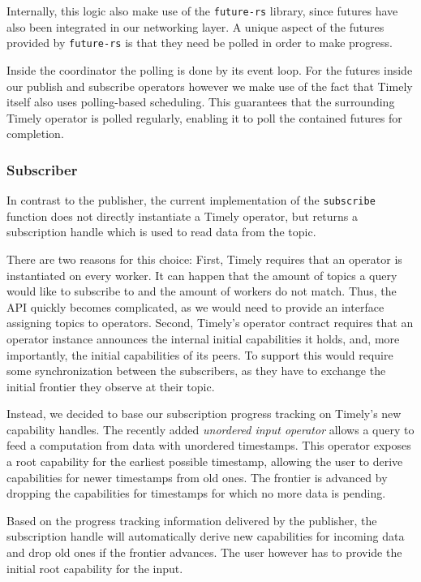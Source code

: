 Internally, this logic also make use of the \lstinline{future-rs} library, 
since futures have also been integrated in our networking layer. A unique
aspect of the futures provided by \lstinline{future-rs} is that they need
be polled in order to make progress.

Inside the coordinator the polling is done by its event loop. For the futures
inside our publish and subscribe operators however we make use of the fact
that Timely itself also uses polling-based scheduling. This guarantees that
the surrounding Timely operator is polled regularly, enabling it to poll
the contained futures for completion.

\subsubsection{Subscriber}

In contrast to the publisher, the current implementation of the \lstinline{subscribe}
function does not directly instantiate a Timely operator, but returns a subscription
handle which is used to read data from the topic.

There are two reasons for this choice: First, Timely requires that an operator
is instantiated on every worker. It can happen that the amount of topics a query
would like to subscribe to and the amount of workers do not match. Thus, the API
quickly becomes complicated, as we would need to provide an interface assigning
topics to operators.
Second, Timely's operator contract requires that an operator instance announces
the internal initial capabilities it holds, and, more importantly, the initial
capabilities of its peers. To support this would require some synchronization
between the subscribers, as they have to exchange the initial frontier they
observe at their topic.

Instead, we decided to base our subscription progress tracking on Timely's new
capability handles. The recently added \emph{unordered input operator} allows
a query to feed a computation from data with unordered timestamps. This operator
exposes a root capability for the earliest possible timestamp, allowing the user
to derive capabilities for newer timestamps from old ones. The frontier
is advanced by dropping the capabilities for timestamps for which no more data
is pending.

Based on the progress tracking information delivered by the publisher, the
subscription handle will automatically derive new capabilities for incoming
data and drop old ones if the frontier advances. The user however has to
provide the initial root capability for the input.

